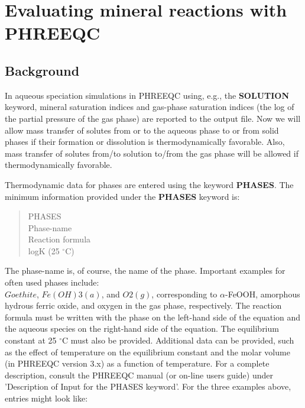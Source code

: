 \chapter{Evaluating mineral reactions with PHREEQC}

\section{Background}

In aqueous speciation simulations in PHREEQC using, e.g., the {\color{red} \textbf{SOLUTION}} 
keyword, mineral saturation indices and gas-phase 
saturation indices (the log of the partial pressure of the gas phase) 
are reported to the output file.  
Now we will allow mass transfer of solutes from or to the aqueous phase to or from solid phases 
if their formation or dissolution is thermodynamically favorable. 
Also, mass transfer of solutes from/to solution to/from the gas phase 
will be allowed if thermodynamically favorable.

Thermodynamic data for phases are entered using the keyword {\color{red} \textbf{PHASES}}.  
The minimum information provided under the {\color{red} \textbf{PHASES}} keyword is:

\begin{quote}
{\color{red}PHASES \\
Phase-name \\
Reaction formula \\
logK (25 $^\circ$C) }\\
\end{quote} 

The phase-name is, of course, the name of the phase. Important examples for often used phases include: \\
$Goethite$, $Fe(OH)3(a)$, and $O2(g)$, corresponding to $\alpha$-FeOOH, amorphous hydrous ferric oxide, 
and oxygen in the gas phase, respectively.  
The reaction formula must be written with the phase on the left-hand side of the equation 
and the aqueous species on the right-hand side of the equation.  
The equilibrium constant at 25 $^\circ$C must also be provided.  
Additional data can be provided, such as the effect of temperature on the 
equilibrium constant and the molar volume (in PHREEQC version 3.x) 
as a function of temperature. For a complete description, 
consult the PHREEQC manual (or on-line users guide) under 
'Description of Input for the PHASES keyword'.  
For the three examples above, entries might look like:



